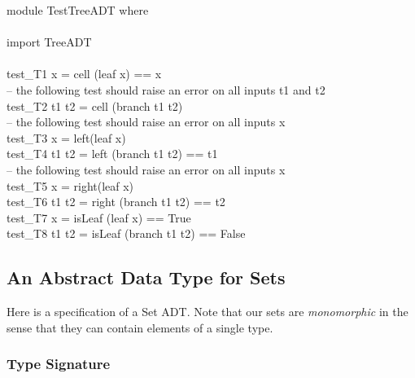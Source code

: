 \documentclass[11pt]{article}
\begin{document}
\begin{program**}
\>            module TestTreeADT where  \\
\>               \\
\>            import TreeADT  \\
\>              \\
\>            test\_T1 x = cell (leaf x) == x  \\
\>            -- the following test should raise an error on all inputs t1 and t2 \\
\>            test\_T2 t1 t2 = cell (branch t1 t2)   \\
\>            -- the following test should raise an error on all inputs x\\
\>            test\_T3 x = left(leaf x)   \\
\>            test\_T4 t1 t2 = left (branch t1 t2) == t1  \\
\>            -- the following test should raise an error on all inputs x\\
\>            test\_T5 x = right(leaf x)   \\
\>            test\_T6 t1 t2 = right (branch t1 t2) == t2  \\
\>            test\_T7 x = isLeaf (leaf x) == True  \\
\>            test\_T8 t1 t2 = isLeaf (branch t1 t2) == False  \\
\end{program**}

\subsection{An Abstract Data Type for Sets}

Here is a specification of a Set ADT.  Note that our sets are
{\em{monomorphic}} in the sense that they can contain elements of a single
type. 

\subsubsection{Type Signature}
\end{document}
